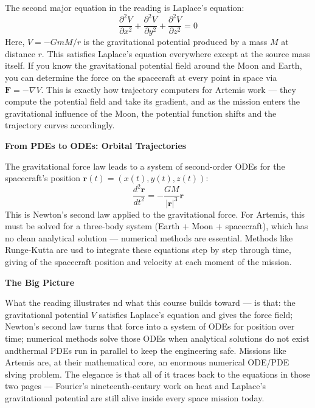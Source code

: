 \begin{respuesta}
The second major equation in the reading is Laplace's equation:
\[
\frac{\partial^2 V}{\partial x^2} + \frac{\partial^2 V}{\partial y^2} + \frac{\partial^2 V}{\partial z^2} = 0
\]
Here, $V = -GmM/r$ is the gravitational potential produced by a mass $M$ at distance $r$. This satisfies Laplace's equation everywhere except at the source mass itself. If you know the gravitational potential field around the Moon and Earth, you can determine the force on the spacecraft at every point in space via $\mathbf{F} = -\nabla V$. This is exactly how trajectory computers for Artemis work — they compute the potential field and take its gradient, and as the mission enters the gravitational influence of the Moon, the potential function shifts and the trajectory curves accordingly.

\medskip

\textbf{From PDEs to ODEs: Orbital Trajectories}

The gravitational force law leads to a system of second-order ODEs for the spacecraft's position $\mathbf{r}(t) = (x(t), y(t), z(t))$:
\[
\frac{d^2\mathbf{r}}{dt^2} = -\frac{GM}{|\mathbf{r}|^3}\mathbf{r}
\]
This is Newton's second law applied to the gravitational force. For Artemis, this must be solved for a three-body system (Earth + Moon + spacecraft), which has no clean analytical solution — numerical methods are essential. Methods like Runge-Kutta are usd to integrate these equations step by step through time, giving of the spacecraft position and velocity at each moment of the mission.

\medskip

\textbf{The Big Picture}

What the reading illustrates nd what this course builds toward — is that: the gravitational potential $V$ satisfies Laplace's equation and gives the force field; Newton's second law turns that force into a system of ODEs for position over time; numerical methods solve those ODEs when analytical solutions do not exist andthermal PDEs run in parallel to keep the engineering safe. Missions like Artemis are, at their mathematical core, an enormous numerical ODE/PDE slving problem. The elegance is that all of it traces back to the equations in those two pages — Fourier's nineteenth-century work on heat and Laplace's gravitational potential are still alive inside every space mission today.
\end{respuesta}




